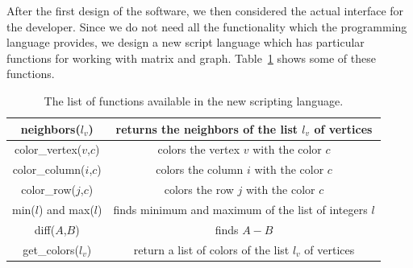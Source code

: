 \documentclass[12pt, twoside,a4paper,toc=bibliography]{scrbook}
\begin{document}
After the first design of the software, we then considered the actual interface
for the developer. Since we do not need all the functionality which the
programming language provides, we design a new script language which
has particular functions for working with matrix and graph.
Table~\ref{command-table} shows some of these functions.
\begin{table}
\begin{tabular}{ | c | c |}
\hline
neighbors($l_v$) & returns the neighbors of the list $l_v$ of vertices \\ \hline
color\_vertex($v$,$c$) & colors the vertex $v$ with the color $c$ \\\hline
color\_column($i$,$c$) & colors the column $i$ with the color $c$ \\\hline
color\_row($j$,$c$) & colors the row $j$ with the color $c$ \\\hline
min($l$) and max($l$) & finds minimum and maximum of the list of integers $l$ \\\hline
diff($A$,$B$) & finds $A - B$ \\\hline
get\_colors($l_v$) & return a list of colors of the list $l_v$ of vertices\\\hline
\end{tabular}
\caption{The list of functions available in the new scripting language.}
\label{command-table}
\end{table}
\end{document}
